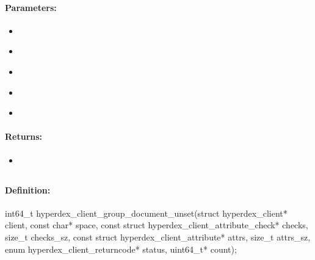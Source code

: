 \paragraph{Parameters:}
\begin{itemize}[noitemsep]
\item {}\\

\item {}\\

\item {}\\

\item {}\\

\item {}\\

\end{itemize}

\paragraph{Returns:}
\begin{itemize}[noitemsep]
\item {}\\

\end{itemize}

\pagebreak
\subsection{}
\label{api:c:group_document_unset}


\paragraph{Definition:}
\begin{ccode}
int64_t hyperdex_client_group_document_unset(struct hyperdex_client* client,
        const char* space,
        const struct hyperdex_client_attribute_check* checks, size_t checks_sz,
        const struct hyperdex_client_attribute* attrs, size_t attrs_sz,
        enum hyperdex_client_returncode* status,
        uint64_t* count);
\end{ccode}

